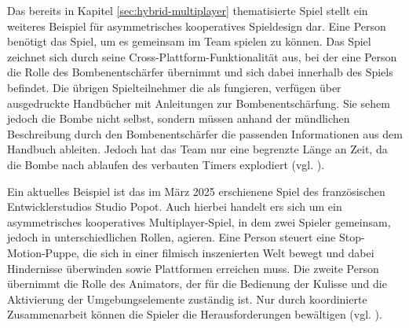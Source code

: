 Das bereits in Kapitel \ref{sec:hybrid-multiplayer} thematisierte Spiel  stellt ein weiteres Beispiel für asymmetrisches kooperatives Spieldesign dar. Eine Person benötigt das Spiel, um es gemeinsam im Team spielen zu können. Das Spiel zeichnet sich durch seine Cross-Plattform-Funktionalität aus, bei der eine Person die Rolle des Bombenentschärfer übernimmt und sich dabei innerhalb des Spiels befindet. Die übrigen Spielteilnehmer die als  fungieren, verfügen über ausgedruckte Handbücher mit Anleitungen zur Bombenentschärfung. Sie sehem jedoch die Bombe nicht selbst, sondern müssen anhand der mündlichen Beschreibung durch den Bombenentschärfer die passenden Informationen aus dem Handbuch ableiten. Jedoch hat das Team nur eine begrenzte Länge an Zeit, da die Bombe nach ablaufen des verbauten Timers explodiert (vgl. \citealp{steel_crate_games_keep_2015}).

Ein aktuelles Beispiel ist das im März 2025 erschienene Spiel  des französischen Entwicklerstudios Studio Popot. Auch hierbei handelt ers sich um ein asymmetrisches kooperatives Multiplayer-Spiel, in dem zwei Spieler gemeinsam, jedoch in unterschiedlichen Rollen, agieren. Eine Person steuert eine Stop-Motion-Puppe, die sich in einer filmisch inszenierten Welt bewegt und dabei Hindernisse überwinden sowie Plattformen erreichen muss. Die zweite Person übernimmt die Rolle des Animators, der für die Bedienung der Kulisse und die Aktivierung der Umgebungselemente zuständig ist. Nur durch koordinierte Zusammenarbeit können die Spieler die Herausforderungen bewältigen (vgl. \citealp{studio_popote_myrmidon_2025}).

